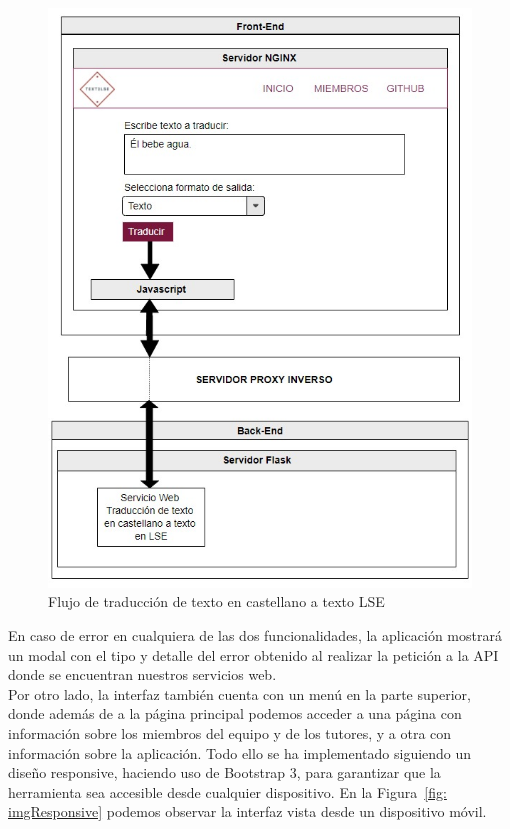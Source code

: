 \begin{figure}[]
	\centering
	\includegraphics[width=1\textwidth]{Imagenes/Fuentes/Text2LSE/esquemaTradTexto.jpg}
	\caption{ Flujo de traducción de texto en castellano a texto LSE }
	\label {fig: esquemaTradTexto}
\end{figure}

En caso de error en cualquiera de las dos funcionalidades, la aplicación mostrará un modal con el tipo y detalle del error obtenido al realizar la petición a la API donde se encuentran nuestros servicios web.\\ 

Por otro lado, la interfaz también cuenta con un menú en la parte superior, donde además de a la página principal podemos acceder a una página con información sobre los miembros del equipo y de los tutores, y a otra con información sobre la aplicación. Todo ello se ha implementado siguiendo un diseño responsive, haciendo uso de Bootstrap 3, para garantizar que la herramienta sea accesible desde cualquier dispositivo. En la Figura~\ref {fig: imgResponsive} podemos observar la interfaz vista desde un dispositivo móvil.\\


